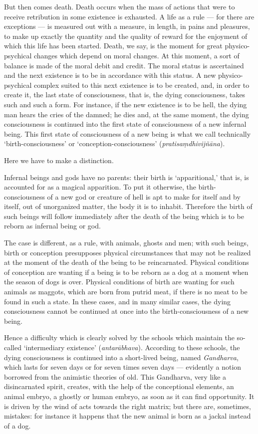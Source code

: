 \documentclass[a4paper, 11pt, oneside, english]{article}
\begin{document}
But then comes death. Death occurs when the mass of actions that were to receive retribution in some existence is exhausted. A life as a rule --- for there are exceptions --- is measured out with a measure, in length, in pains and pleasures, to make up exactly the quantity and the quality of reward for the enjoyment of which this life has been started. Death, we say, is the moment for great physico-psychical changes which depend on moral changes. At this moment, a sort of balance is made of the moral debit and credit. The moral status is ascertained and the next existence is to be in accordance with this status. A new physico-psychical complex suited to this next existence is to be created, and, in order to create it, the last state of consciousness, that is, the dying consciousness, takes such and such a form. For instance, if the new existence is to be hell, the dying man hears the cries of the damned; he dies and, at the same moment, the dying consciousness is continued into the first state of consciousness of a new infernal being. This first state of consciousness of a new being is what we call technically `birth-consciousness' or `conception-consciousness' (\emph{pratisaṃdhivijñāna}).

Here we have to make a distinction.

Infernal beings and gods have no parents: their birth is `apparitional,' that is, is accounted for as a magical apparition. To put it otherwise, the birth-consciousness of a new god or creature of hell is apt to make for itself and by itself, out of unorganized matter, the body it is to inhabit. Therefore the birth of such beings will follow immediately after the death of the being which is to be reborn as infernal being or god.

The case is different, as a rule, with animals, ghosts and men; with such beings, birth or conception presupposes physical circumstances that may not be realized at the moment of the death of the being to be reincarnated. Physical conditions of conception are wanting if a being is to be reborn as a dog at a moment when the season of dogs is over. Physical conditions of birth are wanting for such animals as maggots, which are born from putrid meat, if there is no meat to be found in such a state. In these cases, and in many similar cases, the dying consciousness cannot be continued at once into the birth-consciousness of a new being.

Hence a difficulty which is clearly solved by the schools which maintain the so-called `intermediary existence' (\emph{antarābhava}). According to these schools, the dying consciousness is continued into a short-lived being, named \emph{Gandharva}, which lasts for seven days or for seven times seven days --- evidently a notion borrowed from the animistic theories of old. This Gandharva, very like a disincarnated spirit, creates, with the help of the conceptional elements, an animal embryo, a ghostly or human embryo, as soon as it can find opportunity. It is driven by the wind of acts towards the right matrix; but there are, sometimes, mistakes: for instance it happens that the new animal is born as a jackal instead of a dog.
\end{document}
